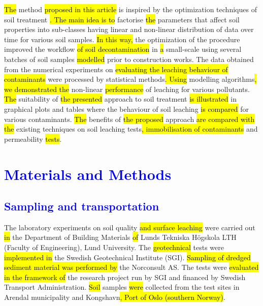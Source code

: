 \documentclass[algorithms,article,submit,pdftex,moreauthors]{Definitions/mdpi}
\begin{document}
\hl{The} method \hl{proposed in this article }is inspired by the optimization techniques of soil treatment \cite{Lindh2001,geotechnics2010005,RehmanMoghal,Yin,Kennedy}\hl{. The main idea is to }factorise \hl{the} parameters that affect soil properties into sub-classes having linear and non-linear distribution of data over time for various soil samples. \hl{In this way, }the optimization of the procedure improved the workflow \hl{of soil decontamination }in \hl{a }small-scale\hl{ }using\hl{ }several batches of soil samples \hl{modelled }prior to \hl{ }construction works. The data obtained from the numerical experiments on \hl{evaluating the leaching behaviour of contaminants} were processed by statistical methods\hl{. Using }modelling algorithms\hl{, we demonstrated the} non-linear \hl{performance} of leaching for various \hl{ }pollutants. \hl{The} suitability of \hl{the presented} approach to soil treatment \hl{is illustrated }in\hl{ }graphical plots and tables where the behaviour of soil leaching \hl{is compared }for various contaminants.\hl{ The }benefits of \hl{the proposed} approach \hl{are compared with the }existing techniques on soil leaching tests\hl{, immobilisation of contaminants} and permeability \hl{tests}.

\section{\textcolor{blue}{Materials and Methods}}

\subsection{\textcolor{blue}{Sampling and transportation}}

The laboratory experiments on soil quality \hl{and surface leaching }were carried out \hl{in} the Department of Building Materials \hl{of} Lunds Tekniska Högskola LTH (Faculty of Engineering), Lund University. The \hl{geotechnical }tests were \hl{implemented in} the Swedish Geotechnical Institute (SGI). \hl{Sampling of dredged sediment material was performed by} the Norconsult AS. The tests were \hl{evaluated in the framework of} the research project run by SGI and financed by\hl{ }Swedish Transport Administration. \hl{Soil} samples \hl{were} collected from the test sites in Arendal municipality\hl{ }and\hl{ }Kongshavn\hl{, Port of Oslo (southern Norway)}.
\end{document}
